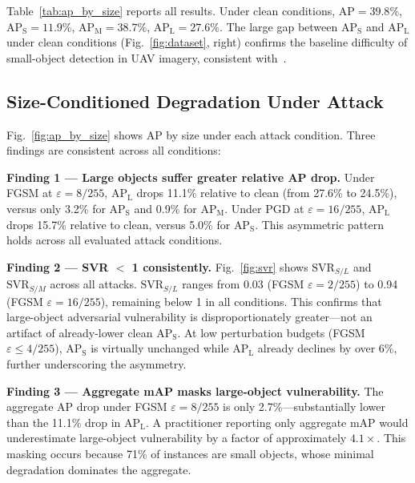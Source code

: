 \documentclass[journal]{IEEEtran}
\begin{document}
Table~\ref{tab:ap_by_size} reports all results.
Under clean conditions, $\text{AP} = 39.8\%$,
$\text{AP}_\text{S} = 11.9\%$,
$\text{AP}_\text{M} = 38.7\%$,
$\text{AP}_\text{L} = 27.6\%$.
The large gap between $\text{AP}_\text{S}$ and
$\text{AP}_\text{L}$ under clean conditions
(Fig.~\ref{fig:dataset}, right) confirms the baseline
difficulty of small-object detection in UAV imagery,
consistent with~\citet{smallObjSurvey2025}.

\subsection{Size-Conditioned Degradation Under Attack}

Fig.~\ref{fig:ap_by_size} shows AP by size under each attack
condition. Three findings are consistent across all conditions:

\textbf{Finding 1 --- Large objects suffer greater relative AP drop.}
Under FGSM at $\varepsilon=8/255$, $\text{AP}_\text{L}$ drops
11.1\% relative to clean (from 27.6\% to 24.5\%),
versus only 3.2\% for $\text{AP}_\text{S}$ and
0.9\% for $\text{AP}_\text{M}$.
Under PGD at $\varepsilon=16/255$, $\text{AP}_\text{L}$ drops
15.7\% relative to clean, versus 5.0\% for $\text{AP}_\text{S}$.
This asymmetric pattern holds across all evaluated attack conditions.

\textbf{Finding 2 --- SVR $<$ 1 consistently.}
Fig.~\ref{fig:svr} shows $\text{SVR}_{S/L}$ and
$\text{SVR}_{S/M}$ across all attacks.
$\text{SVR}_{S/L}$ ranges from 0.03 (FGSM $\varepsilon=2/255$)
to 0.94 (FGSM $\varepsilon=16/255$), remaining below 1 in
all conditions.
This confirms that large-object adversarial vulnerability is
disproportionately greater---not an artifact of already-lower clean
$\text{AP}_\text{S}$.
At low perturbation budgets (FGSM $\varepsilon \leq 4/255$),
$\text{AP}_\text{S}$ is virtually unchanged while $\text{AP}_\text{L}$
already declines by over 6\%, further underscoring the asymmetry.

\textbf{Finding 3 --- Aggregate mAP masks large-object vulnerability.}
The aggregate $\text{AP}$ drop under FGSM $\varepsilon=8/255$
is only 2.7\%---substantially lower than the
11.1\% drop in $\text{AP}_\text{L}$.
A practitioner reporting only aggregate mAP would
underestimate large-object vulnerability by a factor of
approximately $4.1\times$.
This masking occurs because 71\% of instances are small objects,
whose minimal degradation dominates the aggregate.


\end{document}
